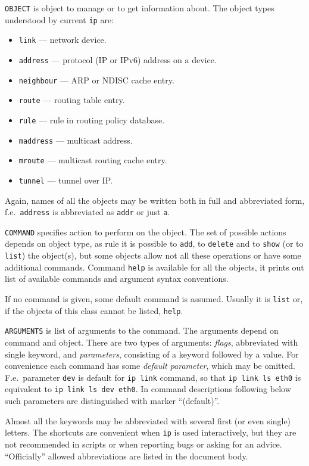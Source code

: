 \verb|OBJECT| is object to manage or to get information about.
The object types understood by current \verb|ip| are:

\begin{itemize}
\item \verb|link| --- network device.
\item \verb|address| --- protocol (IP or IPv6) address on a device.
\item \verb|neighbour| --- ARP or NDISC cache entry.
\item \verb|route| --- routing table entry.
\item \verb|rule| --- rule in routing policy database.
\item \verb|maddress| --- multicast address.
\item \verb|mroute| --- multicast routing cache entry.
\item \verb|tunnel| --- tunnel over IP.
\end{itemize}

Again, names of all the objects may be written both in full
and abbreviated form, f.e.\ \verb|address| is abbreviated as \verb|addr|
or just \verb|a|.

\verb|COMMAND| specifies action to perform on the object.
The set of possible actions depends on object type,
as rule it is possible to \verb|add|, to \verb|delete| and
to \verb|show| (or to \verb|list|) the object(s), but some objects
allow not all these operations or have some additional commands.
Command \verb|help| is available for all the objects, it prints
out list of available commands and argument syntax conventions.

If no command is given, some default command is assumed.
Usually it is \verb|list| or, if the objects of this class
cannot be listed, \verb|help|.

\verb|ARGUMENTS| is list of arguments to the command.
The arguments depend on command and object. There are two types of arguments:
{\em flags\/}, abbreviated with single keyword, and {\em parameters\/},
consisting of a keyword followed by a value. For convenience
each command has some {\em default parameter\/},
which may be omitted. F.e.\ parameter \verb|dev| is default
for {\tt ip link} command, so that {\tt ip link ls eth0} is equivalent
to {\tt ip link ls dev eth0}.
In command descriptions following below such parameters
are distinguished with marker ``(default)''.

Almost all the keywords may be abbreviated with several first (or even single)
letters. The shortcuts are convenient when \verb|ip| is used interactively,
but they are not recommended in scripts or when reporting bugs
or asking for an advice. ``Officially'' allowed abbreviations are listed
in the document body.




